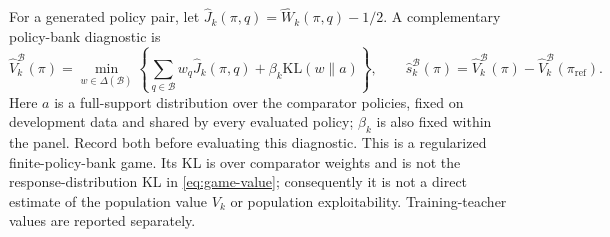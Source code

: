 \documentclass{article}
\theoremstyle{remark}
\theoremstyle{plain}
\newcommand{\KL}{\mathrm{KL}}
\newcommand{\piref}{\pi_{\mathrm{ref}}}
\begin{document}
For a generated policy pair, let $\widehat J_k(\pi,q)=\widehat W_k(\pi,q)-1/2$. A complementary policy-bank diagnostic is
\[
 \widehat V_k^{\mathcal B}(\pi)
 =\min_{w\in\Delta(\mathcal B)}
 \left\{\sum_{q\in\mathcal B}w_q\widehat J_k(\pi,q)
        +\beta_k\KL(w\|a)\right\},
 \qquad
 \widehat s_k^{\mathcal B}(\pi)
 =\widehat V_k^{\mathcal B}(\pi)-\widehat V_k^{\mathcal B}(\piref).
\]
Here $a$ is a full-support distribution over the comparator policies, fixed on development data and shared by every evaluated policy; $\beta_k$ is also fixed within the panel. Record both before evaluating this diagnostic. This is a regularized finite-policy-bank game. Its KL is over comparator weights and is not the response-distribution KL in \eqref{eq:game-value}; consequently it is not a direct estimate of the population value $V_k$ or population exploitability. Training-teacher values are reported separately.
\end{document}
